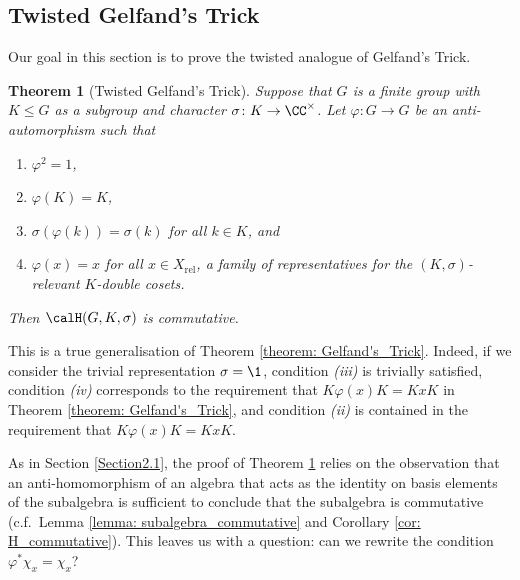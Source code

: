 \documentclass[11pt]{amsart}
\newtheorem{thm}{Theorem}
\theoremstyle{remark}
\begin{document}

\subsection{Twisted Gelfand's Trick}\label{Section2.3}
Our goal in this section is to prove the twisted analogue of Gelfand's Trick.
\begin{thm}[Twisted Gelfand's Trick]\label{twisted_trick}
	Suppose that $G$ is a finite group with $K\leq G$ as a subgroup and character $\sigma\colon K\to\CC^\times$.
	Let $\varphi\colon G\to G$ be an anti-automorphism such that
	\begin{enumerate}[\itshape(i)]
		\item $\varphi^2=1$,
		\item $\varphi(K)=K$,
		\item $\sigma(\varphi(k))=\sigma(k)$ for all $k\in K$, and
		\item $\varphi(x) = x$ for all $x\in X_\mathrm{rel}$, a family of representatives for the $(K,\sigma)$-relevant $K$-double cosets.
	\end{enumerate}
	Then $\calH(G,K,\sigma)$ is commutative.
\end{thm}
This is a true generalisation of Theorem \ref{theorem: Gelfand's_Trick}.
Indeed, if we consider the trivial representation $\sigma=\1$, condition {\itshape(iii)} is trivially satisfied, condition {\itshape(iv)} corresponds to the requirement that $K\varphi(x)K=KxK$ in Theorem \ref{theorem: Gelfand's_Trick}, and condition {\itshape(ii)} is contained in the requirement that $K\varphi(x)K=KxK$.

As in Section \ref{Section2.1}, the proof of Theorem \ref{twisted_trick} relies on the observation that an anti-homomorphism of an algebra that acts as the identity on basis elements of the subalgebra is sufficient to conclude that the subalgebra is commutative (c.f.\ Lemma \ref{lemma: subalgebra_commutative} and Corollary \ref{cor: H_commutative}).
This leaves us with a question: can we rewrite the condition $\varphi^\ast \chi_x = \chi_x$?
\end{document}
